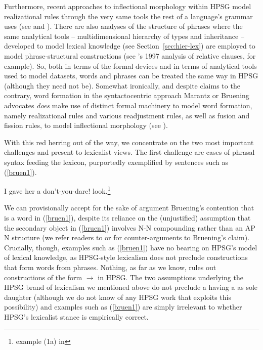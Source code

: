 \documentclass[output=paper
 	        ,biblatex
                ,babelshorthands
                ,newtxmath
                ,draftmode
                ,colorlinks, citecolor=brown
]{langscibook}
\begin{document}
Furthermore, recent approaches to inflectional morphology within HPSG model realizational rules through the very same tools the rest of a language's grammar uses (see \citealt{CrysmannandBonami2016} and ).  There are also analyses of the structure of phrases where the same analytical tools -- multidimensional hierarchy of types and inheritance -- developed to model lexical knowledge (see Section~\ref{sec:hier-lex}) are employed to model phrase-structural constructions (see \citeauthor{Sag1997}'s 1997 analysis of relative clauses, for example). So, both in terms of the formal devices and in terms of analytical tools used to model datasets, words and phrases can be treated the same way in HPSG (although they need not be). Somewhat ironically, and despite claims to the contrary, word formation in the syntactocentric approach Marantz or Bruening advocates \emph{does} make use of distinct formal machinery to model word formation, namely realizational rules and various readjustment rules, as well as fusion and fission rules, to model inflectional morphology (see \citealt{HalleandMarantz1993,Embick2015}).

With this red herring out of the way, we concentrate on the two most important challenges \citet{Bruening2018} and \citet{Haspelmath2011} present to lexicalist views. The first challenge are cases of phrasal syntax feeding the lexicon, purportedly exemplified by sentences such as (\ref{bruen1}).

\ea
\label{bruen1}
I gave her a don't-you-dare! look.\footnote{
example (1a) in 
}
\z

We can provisionally accept for the sake of argument Bruening's contention that  is a word in (\ref{bruen1}), despite its reliance on the (unjustified) assumption that the secondary object in (\ref{bruen1}) involves N-N compounding rather than an AP N structure (we refer readers to \citealt{BresnanandMchombo1995} or \citealt{MuellerLexicalism} for counter-arguments to Bruening's claim). Crucially, though, examples such as (\ref{bruen1}) have no bearing on HPSG's model of lexical knowledge, as HPSG-style lexicalism does not preclude constructions that form words from phrases. Nothing, as far as we know, rules out constructions of the form   $\rightarrow$  in HPSG. The two assumptions underlying the HPSG brand of lexicalism we mentioned above do not preclude a  having a  as sole daughter (although we do not know of any HPSG work that exploits this possibility) and examples such as (\ref{bruen1}) are simply irrelevant to whether HPSG's lexicalist stance is empirically correct.
\end{document}

